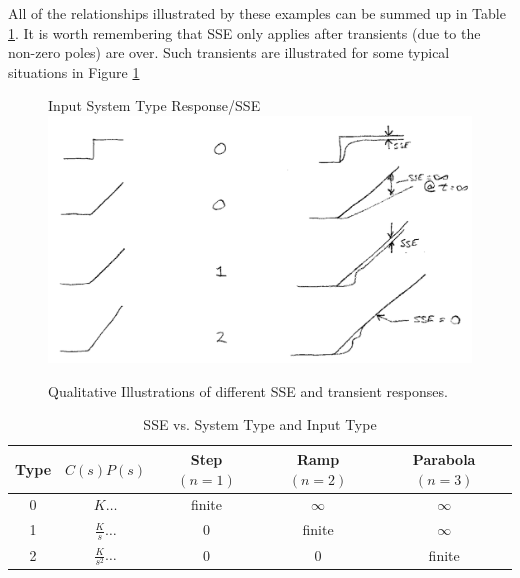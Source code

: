 All of the relationships illustrated by these examples can be summed up in Table \ref{SystemTypeError}.
It is worth remembering that SSE only applies after transients (due to the non-zero poles) are over.  Such transients are illustrated for some typical situations in Figure \ref{SSEtransients}


\begin{figure}\centering
Input \hspace{0.75in}  System Type \hspace{0.5in} Response/SSE\\[0.1in]
\includegraphics[width=4.50in]{figs11/00476a.png}\caption{Qualitative Illustrations of different SSE and transient responses.}\label{SSEtransients}
\end{figure}




\begin{table}\centering
\begin{tabular}{|c|c|c|c|c|} \hline
Type	&	$C(s)P(s)$	&	Step $(n=1)$	&	Ramp $(n=2)$	& 	Parabola $(n=3)$   \\ \hline
0	&	$K\dots$	&	finite		&	$\infty$	&	$\infty$	   \\ \hline
1	&	$\frac{K}{s}\dots$&	0		&	finite		&	$\infty$	   \\ \hline
2	&	$\frac{K}{s^2}\dots$&0		&       0        	&	finite		   \\ \hline
\end{tabular}

\caption{SSE vs. System Type and Input Type}\label{SystemTypeError}
\end{table}




